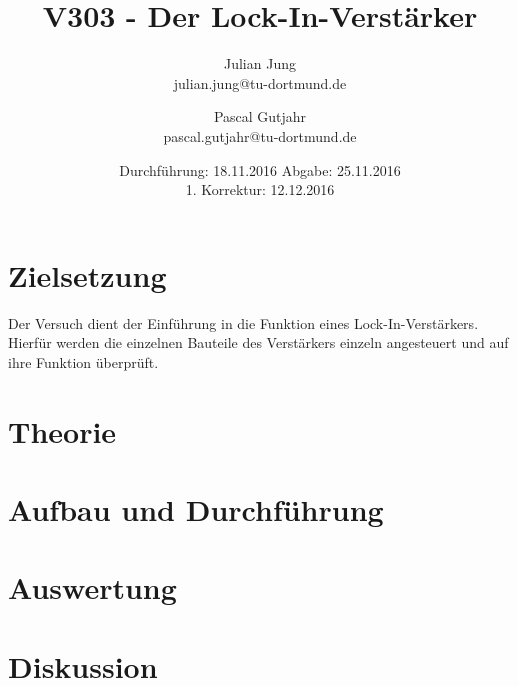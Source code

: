 

\title{V303 - Der Lock-In-Verstärker}
\author{Julian Jung \\ julian.jung@tu-dortmund.de
  \and Pascal Gutjahr \\ pascal.gutjahr@tu-dortmund.de}
  \date{Durchführung: 18.11.2016
  \hspace{3em}
  Abgabe: 25.11.2016 \\
  1. Korrektur: 12.12.2016}
  
\maketitle
\newpage
\tableofcontents
\newpage
\section{Zielsetzung}
Der Versuch dient der Einführung in die Funktion eines Lock-In-Verstärkers.
Hierfür werden die einzelnen Bauteile des Verstärkers einzeln angesteuert und
auf ihre Funktion überprüft.
\section{Theorie}

\section{Aufbau und Durchführung}

\section{Auswertung}

\newpage
\section{Diskussion}

\printbibliography

